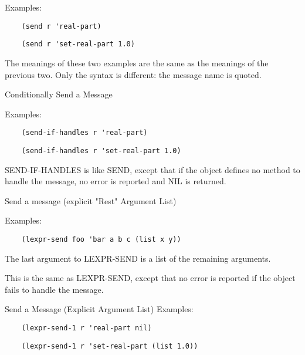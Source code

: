 {}
    Examples:
\begin{verbatim}
    (send r 'real-part)
\end{verbatim}
\begin{verbatim}
    (send r 'set-real-part 1.0)
\end{verbatim}
   
 The  meanings  of  these  two  examples  are the same as the
    meanings of the previous two.  Only the syntax is different:
    the message name is quoted.

{    Conditionally Send a Message
}

    Examples:
\begin{verbatim}
    (send-if-handles r 'real-part)
\end{verbatim}
\begin{verbatim}
    (send-if-handles r 'set-real-part 1.0)
\end{verbatim}
    
SEND-IF-HANDLES is like SEND,  except  that  if  the  object
    defines  no  method  to  handle  the  message,  no  error is
    reported and NIL is returned.

{    Send a message (explicit "Rest" Argument List)
}
    
				Examples:
\begin{verbatim}
    (lexpr-send foo 'bar a b c (list x y))
\end{verbatim}
    
The last argument to LEXPR-SEND is a list of  the  remaining
    arguments.

{                                                      
    This  is  the  same  as  LEXPR-SEND, except that no error is
    reported if the object fails to handle the message.
}

{    Send a Message (Explicit Argument List)
}
    Examples:
\begin{verbatim}
    (lexpr-send-1 r 'real-part nil)
\end{verbatim}
\begin{verbatim}
    (lexpr-send-1 r 'set-real-part (list 1.0))
\end{verbatim}
    
